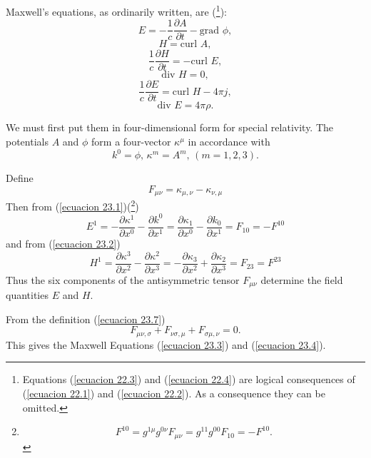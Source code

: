 Maxwell's equations, as ordinarily written, are (\footnote{Equations (\ref{ecuacion 22.3}) and (\ref{ecuacion 
22.4}) are logical consequences of (\ref{ecuacion 22.1}) and (\ref{ecuacion 22.2}). As a consequence they can be 
omitted.}):
\begin{equation}
 \label{ecuacion 23.1}
 E = - \frac{1}{c}\frac{\partial A}{\partial t} - \mbox{grad }\phi,
\end{equation}
\begin{equation}
 \label{ecuacion 23.2}
 H = \mbox{curl } A,
\end{equation}
\begin{equation}
 \label{ecuacion 23.3}
 \frac{1}{c}\frac{\partial H}{\partial t} = - \mbox{curl } E,
\end{equation}
\begin{equation}
 \label{ecuacion 23.4}
 \mbox{div } H = 0,
\end{equation}
\begin{equation}
 \label{ecuacion 23.5}
 \frac{1}{c}\frac{\partial E}{\partial t} = \mbox{curl } H - 4 \pi j,
\end{equation}
\begin{equation}
 \label{ecuacion 23.6}
 \mbox{div } E = 4 \pi \rho.
\end{equation}

We must first put them in four-dimensional form for special relativity. The potentials $A$ and $\phi$ form a 
four-vector $\kappa^\mu$ in accordance with 
\[
k^0 = \phi \mbox{, } \kappa^m = A^m\mbox{, }(m=1,2,3).
\]

Define 
\begin{equation}
\label{ecuacion 23.7}
 F_{\mu\nu} = \kappa_{\mu,\nu} - \kappa_{\nu,\mu}
\end{equation}
Then from (\ref{ecuacion 23.1})(\footnote{\[
    F^{10} = g^{1\mu}g^{0\nu} F_{\mu\nu} = g^{11}g^{00} F_{10} = - F^{10}.
\]})
\[
 E^1 = - \frac{\partial \kappa^1}{\partial x^0} - \frac{\partial k^0}{\partial x^1}
     =   \frac{\partial \kappa_1}{\partial x^0} - \frac{\partial k_0}{\partial x^1}
     =   F_{10}
     = - F^{10}
\]
and from (\ref{ecuacion 23.2})
\[
    H^1 =   \frac{\partial \kappa^3}{\partial x^2} - \frac{\partial \kappa^2}{\partial x^3}
        = - \frac{\partial \kappa_3}{\partial x^2} + \frac{\partial \kappa_2}{\partial x^3}
        = F_{23} = F^{23}
\]
Thus the six components of the antisymmetric tensor $F_{\mu\nu}$ determine the field quantities $E$ and $H$.

From the definition (\ref{ecuacion 23.7})
\[
  F_{\mu\nu,\sigma} + F_{\nu\sigma,\mu} + F_{\sigma\mu,\nu} = 0.
\]
This gives the Maxwell Equations (\ref{ecuacion 23.3}) and (\ref{ecuacion 23.4}).






